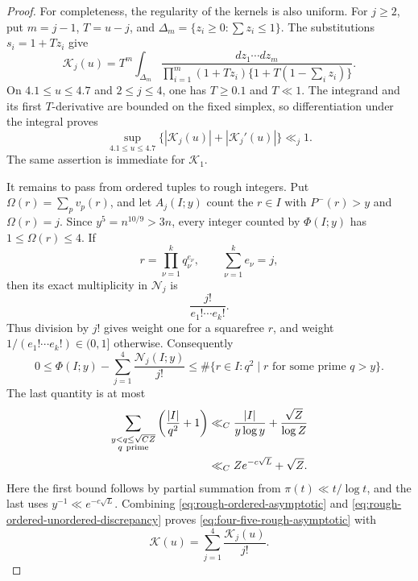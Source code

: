 \documentclass[11pt]{article}
\numberwithin{equation}{section}
\theoremstyle{definition}
\theoremstyle{remark}
\newcommand{\1}{\mathbf 1}
\begin{document}
\begin{proof}
For completeness, the regularity of the kernels is also uniform.  For
\(j\ge2\), put \(m=j-1\), \(T=u-j\), and
\(\Delta_m=\{z_i\ge0:\sum z_i\le1\}\).  The substitutions
\(s_i=1+Tz_i\) give
\begin{equation}
 \mathcal K_j(u)=T^m\int_{\Delta_m}
 \frac{dz_1\cdots dz_m}
 {\prod_{i=1}^m(1+Tz_i)
  \{1+T(1-\sum_i z_i)\}}.
 \label{eq:rough-kernel-fixed-simplex}
\end{equation}
On \(4.1\le u\le4.7\) and \(2\le j\le4\), one has \(T\ge0.1\)
and \(T\ll1\).  The integrand and its first \(T\)-derivative are bounded
on the fixed simplex, so differentiation under the integral proves
\begin{equation}
 \sup_{4.1\le u\le4.7}
 \{|\mathcal K_j(u)|+|\mathcal K_j'(u)|\}\ll_j1.
 \label{eq:rough-kernel-C1}
\end{equation}
The same assertion is immediate for \(\mathcal K_1\).

It remains to pass from ordered tuples to rough integers.  Put
\(\Omega(r)=\sum_pv_p(r)\), and let \(A_j(I;y)\) count the \(r\in I\)
with \(P^-(r)>y\) and \(\Omega(r)=j\).  Since
\(y^5=n^{10/9}>3n\), every integer counted by \(\Phi(I;y)\) has
\(1\le\Omega(r)\le4\).  If
\[
                  r=\prod_{\nu=1}^kq_\nu^{e_\nu},
 \qquad            \sum_{\nu=1}^ke_\nu=j,
\]
then its exact multiplicity in \(\mathcal N_j\) is
\begin{equation}
                         \frac{j!}{e_1!\cdots e_k!}.
 \label{eq:rough-exact-ordered-multiplicity}
\end{equation}
Thus division by \(j!\) gives weight one for a squarefree \(r\), and
weight \(1/(e_1!\cdots e_k!)\in(0,1]\) otherwise.  Consequently
\begin{equation}
 0\le\Phi(I;y)-\sum_{j=1}^4\frac{\mathcal N_j(I;y)}{j!}
 \le\#\{r\in I:q^2\mid r\text{ for some prime }q>y\}.
 \label{eq:rough-ordered-unordered-discrepancy}
\end{equation}
The last quantity is at most
\begin{align}
 \sum_{\substack{y<q\le\sqrt{CZ}\\q\ {\rm prime}}}
       \left(\frac{|I|}{q^2}+1\right)
 &\ll_C\frac{|I|}{y\log y}+\frac{\sqrt Z}{\log Z}\notag\\
 &\ll_CZe^{-c\sqrt L}+\sqrt Z.
 \label{eq:rough-repeated-prime-total}
\end{align}
Here the first bound follows by partial summation from
\(\pi(t)\ll t/\log t\), and the last uses
\(y^{-1}\ll e^{-c\sqrt L}\).  Combining
\eqref{eq:rough-ordered-asymptotic} and
\eqref{eq:rough-ordered-unordered-discrepancy} proves
\eqref{eq:four-five-rough-asymptotic} with
\[
                 \mathcal K(u)=\sum_{j=1}^4\frac{\mathcal K_j(u)}{j!}.
\]
\end{proof}
\end{document}

